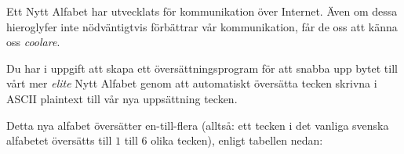 

Ett Nytt Alfabet har utvecklats för kommunikation över Internet. Även om dessa hieroglyfer inte nödväntigtvis 
förbättrar vår kommunikation, får de oss att känna oss \emph{coolare}.

Du har i uppgift att skapa ett översättningsprogram för att snabba upp bytet till vårt mer \emph{elite}
Nytt Alfabet genom att automatiskt översätta tecken skrivna i ASCII plaintext till vår nya uppsättning tecken.

Detta nya alfabet översätter en-till-flera (alltså: ett tecken i det vanliga
svenska alfabetet översätts till $1$ till $6$ olika tecken), enligt tabellen
nedan:

